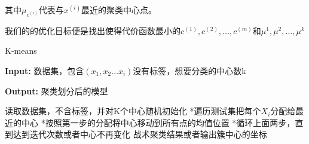 \documentclass[supercite]{Experimental_Report}
\theoremstyle{definition}
\begin{document}
$
其中  \mu_{c^{(i)}}  代表与  x^{(i)}  最近的聚类中心点。
$

$
我们的的优化目标便是找出使得代价函数最小 的  c^{(1)}, c^{(2)}, \ldots, c^{(m)} 
和  \mu^{1}, \mu^{2}, \ldots, \mu^{k}  
$
\begin{algorithm}[htb]
\caption{K-means}
\label{alg:F4}
\hspace*{0.02in} {\bf Input:}
数据集，包含$(x_1,x_2...x_i)$没有标签，想要分类的中心数k

\hspace*{0.02in} {\bf Output:} 聚类划分后的模型
  \begin{algorithmic}[1]
    \State
        读取数据集，不含标签，并对K个中心随机初始化
    \State
        *遍历测试集把每个$X_i$分配给最近的中心
    \State
        *按照第一步的分配将中心移动到所有点的均值位置
    \State
        *循环上面两步，直到达到迭代次数或者中心不再变化
    \State
        战术聚类结果或者输出簇中心的坐标
  \end{algorithmic}
\end{algorithm}
\clearpage
\end{document}
